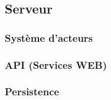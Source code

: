 \subsection{Serveur}
\subsubsection{Système d'acteurs}\label{systeme-acteurs}
\subsubsection{API (Services WEB)}
\subsubsection{Persistence}